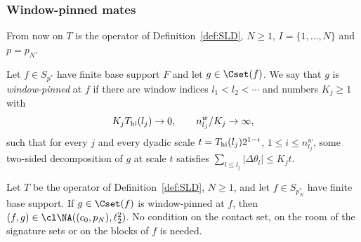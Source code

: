 
\subsubsection*{Window-pinned mates}
From now on $T$ is the operator of Definition~\ref{def:SLD}, $N\ge1$,
$I=\{1,\dots,N\}$ and $p=p_N$.

\begin{definition}\label{def:windowpinned}
Let $f\in S_{p^*}$ have finite base support $F$ and let $g\in\Cset(f)$.  We
say that $g$ is \emph{window-pinned} at $f$ if there are window indices
$l_1<l_2<\cdots$ and numbers $K_j\ge1$ with
\[
 K_jT_{\rm hi}(l_j)\to0,\qquad n^w_{l_j}/K_j\to\infty,
\]
such that for every $j$ and every dyadic scale $t=T_{\rm hi}(l_j)2^{1-i}$,
$1\le i\le n^w_{l_j}$, some two-sided decomposition of $g$ at scale $t$
satisfies $\sum_{l\le l_j}|\Delta\theta_l|\le K_jt$.
\end{definition}

\begin{theorem}\label{thm:Bstar}
Let $T$ be the operator of Definition~\ref{def:SLD}, $N\ge1$, and let
$f\in S_{p_N^*}$ have finite base support.  If $g\in\Cset(f)$ is
window-pinned at $f$, then $(f,g)\in\cl\NA((c_0,p_N),\ell_2^2)$.  No
condition on the contact set, on the room of the signature sets or on
the blocks of $f$ is needed.
\end{theorem}

